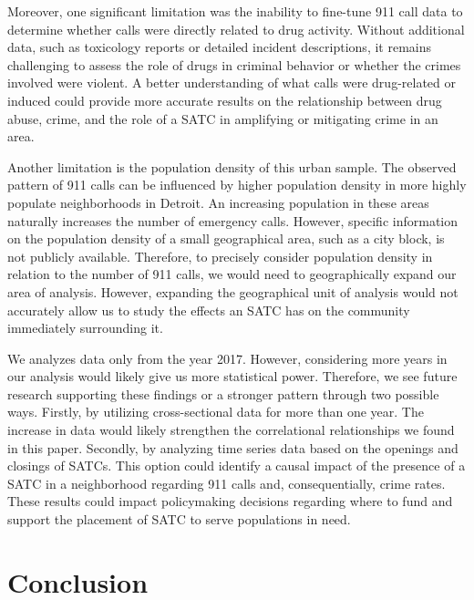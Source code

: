 \documentclass[12pt]{article}
\begin{document}
Moreover, one significant limitation was the inability to fine-tune 911 call data to determine whether calls were directly related to drug activity. Without additional data, such as toxicology reports or detailed incident descriptions, it remains challenging to assess the role of drugs in criminal behavior or whether the crimes involved were violent. A better understanding of what calls were drug-related or induced could provide more accurate results on the relationship between drug abuse, crime, and the role of a SATC in amplifying or mitigating crime in an area. 
    
Another limitation is the population density of this urban sample. The observed pattern of 911 calls can be influenced by higher population density in more highly populate neighborhoods in Detroit. An increasing population in these areas naturally increases the number of emergency calls. However, specific information on the population density of a small geographical area, such as a city block, is not publicly available. Therefore, to precisely consider population density in relation to the number of 911 calls, we would need to geographically expand our area of analysis. However, expanding the geographical unit of analysis would not accurately allow us to study the effects an SATC has on the community immediately surrounding it. 

We analyzes data only from the year 2017. However, considering more years in our analysis would likely give us more statistical power. Therefore, we see future research supporting these findings or a stronger pattern through two possible ways. Firstly, by utilizing cross-sectional data for more than one year. The increase in data would likely strengthen the correlational relationships we found in this paper. Secondly, by analyzing time series data based on the openings and closings of SATCs. This option could identify a causal impact of the presence of a SATC in a neighborhood regarding 911 calls and, consequentially, crime rates. These results could impact policymaking decisions regarding where to fund and support the placement of SATC to serve populations in need. 

\section{Conclusion}
\label{sec:conclusion}
\end{document}
